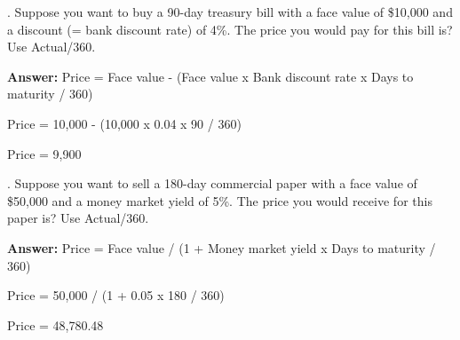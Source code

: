 \documentclass[11.5pt]{article}
\begin{document}
\newcommand*\ruleline[1]{\par\noindent\raisebox{.8ex}{\makebox[\linewidth]{\hrulefill\hspace{1ex}\raisebox{-.8ex}{#1}\hspace{1ex}\hrulefill}}}

\renewcommand{\headheight}{0.7in}
\setlength{\headwidth}{\textwidth}
\renewcommand{\footrulewidth}{0.4pt}
\fancyfoot[L]{\sc{}}
\pagestyle{fancy}
\vspace{1.5cm}
\onehalfspacing

\begin{center}
\large{\textbf{}}
\vspace{1.0cm}
\end{center}



\vspace{20pt}


. Suppose you want to buy a 90-day treasury bill with a face value of \$10,000 and a discount (= bank discount rate) of 4\%. The price you would pay for this bill is? Use Actual/360.

\vspace{20pt}
\textbf{Answer:} Price = Face value - (Face value x Bank discount rate x Days to maturity / 360)

Price = 10,000 - (10,000 x 0.04 x 90 / 360)

Price = 9,900



\vspace{80pt}



. Suppose you want to sell a 180-day commercial paper with a face value of \$50,000 and a money market yield of 5\%. The price you would receive for this paper is? Use Actual/360.

\vspace{20pt}
\textbf{Answer:} Price = Face value / (1 + Money market yield x Days to maturity / 360)

Price = 50,000 / (1 + 0.05 x 180 / 360)

Price = 48,780.48





\vspace{80pt}
\end{document}
